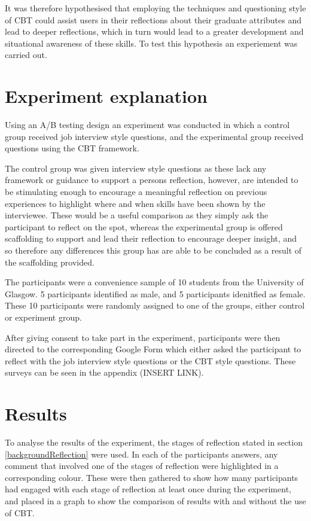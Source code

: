 \documentclass{l4proj}
\begin{document}
It was therefore hypothesised that employing the techniques and questioning style of CBT could assist users in their reflections about their
graduate attributes and lead to deeper reflections, which in turn would lead to a greater development and situational awareness of these skills. 
To test this hypothesis an experiement was carried out.

\section{Experiment explanation}

Using an A/B testing design an experiment was conducted in which a control group received job interview style questions, and the experimental group received
questions using the CBT framework. 

The control group was given interview style questions as these lack any framework or guidance to support a persons reflection, however, are intended to be
stimulating enough to encourage a meaningful reflection on previous experiences to highlight where and when skills have been shown by the interviewee. 
These would be a useful comparison as they simply ask the participant to reflect on the spot, whereas the experimental group is offered scaffolding to support
and lead their reflection to encourage deeper insight, and so therefore any differences this group has are able to be concluded as a result of the scaffolding
provided. 

The participants were a convenience sample of 10 students from the University of Glasgow. 5 participants identified as male, and 5 participants idenitfied 
as female. These 10 participants were randomly assigned to one of the groups, either control or experiment group.

After giving consent to take part in the experiment, participants were then directed to the corresponding Google Form which either asked the participant 
to reflect with the job interview style questions or the CBT style questions. These surveys can be seen in the appendix (INSERT LINK).


\section{Results}

To analyse the results of the experiment, the stages of reflection stated in section \ref{backgroundReflection} were used. In each of the participants answers,
any comment that involved one of the stages of reflection were highlighted in a corresponding colour. These were then gathered to show how many participants
had engaged with each stage of reflection at least once during the experiment, and placed in a graph to show the comparison of results with and without the
use of CBT.
\end{document}
